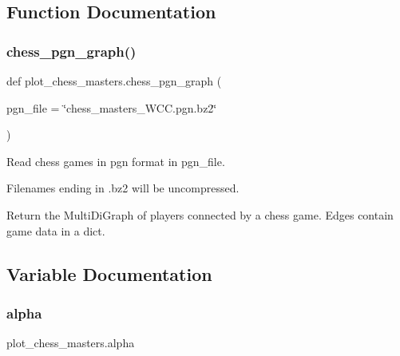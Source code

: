 \subsection{Function Documentation}
\mbox{\label{namespaceplot__chess__masters_af98462d231a4f0d13d13c99476716cac}} 
\subsubsection{\texorpdfstring{chess\+\_\+pgn\+\_\+graph()}{chess\_pgn\_graph()}}
{\footnotesize\ttfamily def plot\+\_\+chess\+\_\+masters.\+chess\+\_\+pgn\+\_\+graph (\begin{DoxyParamCaption}\item[{}]{pgn\+\_\+file = {\ttfamily \char`\"{}chess\+\_\+masters\+\_\+WCC.pgn.bz2\char`\"{}} }\end{DoxyParamCaption})}

\begin{DoxyVerb}Read chess games in pgn format in pgn_file.

Filenames ending in .bz2 will be uncompressed.

Return the MultiDiGraph of players connected by a chess game.
Edges contain game data in a dict.\end{DoxyVerb}
 

\subsection{Variable Documentation}
\mbox{\label{namespaceplot__chess__masters_abd323dff0f26170ff399fc17e0ec8470}} 
\subsubsection{\texorpdfstring{alpha}{alpha}}
{\footnotesize\ttfamily plot\+\_\+chess\+\_\+masters.\+alpha}

\mbox{\label{namespaceplot__chess__masters_a14ad4300f09a3eb782afc048a5fc7650}} 
